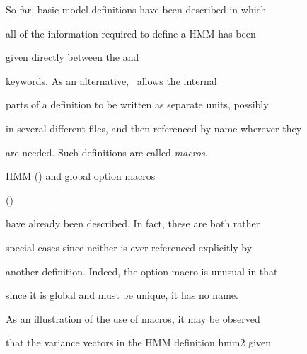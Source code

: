 









So far, basic model definitions have been described in which


all of the information required to define a HMM has been


given directly between the   and 


keywords.  As an alternative, \HTK\ allows the internal


parts of a definition to be written as separate units, possibly


in several different files, and then referenced by name wherever they


are needed.  Such definitions are called \textit{macros}.  













HMM () and global option macros


 ()


have already been described.  In fact, these are both rather


special cases since neither is ever referenced explicitly by


another definition.  Indeed, the option macro is unusual in that


since it is global and must be unique, it has no name.


As an illustration of the use of macros, it may be observed


that the variance vectors in the HMM definition \textsf{hmm2} given


